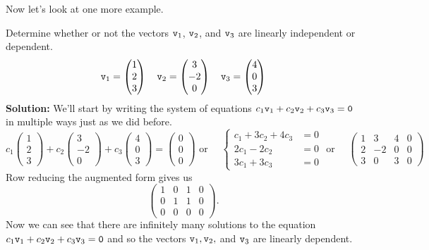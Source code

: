 Now let's look at one more example.
\begin{example}
Determine whether or not the vectors $\texttt{v}_1$, $\texttt{v}_2$, and $\texttt{v}_3$ are linearly independent or
dependent.
\[ \texttt{v}_1 = \begin{pmatrix} 1 \\ 2 \\ 3 \end{pmatrix} \quad \texttt{v}_2 = \begin{pmatrix} 3 \\ -2 \\
    0 \end{pmatrix} \quad \texttt{v}_3 = \begin{pmatrix} 4 \\ 0 \\ 3 \end{pmatrix} \]
{\bf Solution:}
We'll start by writing the system of equations $c_1 \texttt{v}_1 + c_2 \texttt{v}_2 + c_3 \texttt{v}_3 = \texttt{0}$
in multiple ways just as we did before.
\[ c_1 \begin{pmatrix} 1 \\ 2 \\ 3 \end{pmatrix} + c_2 \begin{pmatrix} 3 \\ -2 \\ 0
    \end{pmatrix} + c_3 \begin{pmatrix} 4 \\ 0 \\ 3 \end{pmatrix} = \begin{pmatrix} 0 \\
    0 \\ 0 \end{pmatrix} \text{ or } \quad \left\{ \begin{array}{cl} c_1 + 3c_2 + 4c_3 &= 0 \\ 2c_1 - 2c_2  &= 0 \\ 3c_1 +
    3c_3 &= 0 \end{array} \right. \text{ or } \quad  \left( \begin{array}{ccc|c} 1 & 3 & 4 & 0 \\ 2 & -2 & 0 & 0 \\ 3 & 0 & 3 & 0 \end{array}
\right) \]
Row reducing the augmented form gives us
\[ \left( \begin{array}{ccc|c} 1 & 0 & 1 & 0 \\ 0 & 1 & 1 & 0 \\ 0 & 0 & 0 & 0 \end{array}
\right). \]
Now we can see that there are infinitely many solutions to the equation $c_1 \texttt{v}_1 + c_2
\texttt{v}_2 + c_3 \texttt{v}_3 = \texttt{0}$ and so the vectors $\texttt{v}_1, \texttt{v}_2,$ and $\texttt{v}_3$ are linearly
dependent. 


\end{example}
